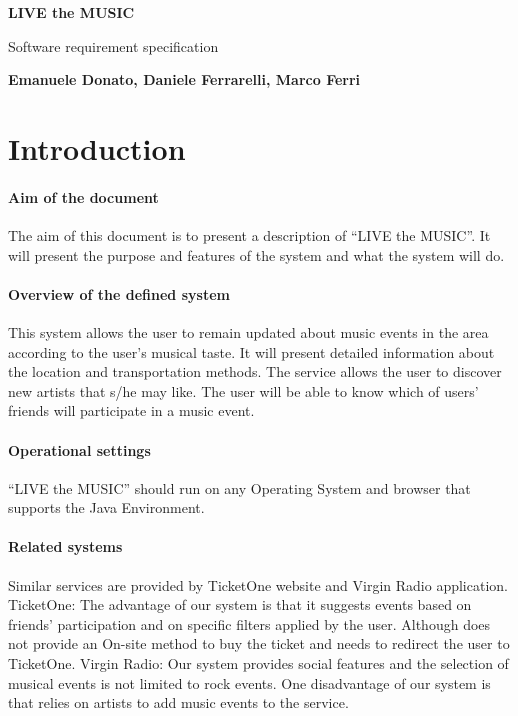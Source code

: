 \documentclass[11pt,a4paper]{article}
\begin{document}
\begin{titlepage}
   \begin{center}
       \vspace*{1cm}
 
       \textbf{LIVE the MUSIC}
 
       \vspace{0.5cm}
        Software requirement specification
 
       \vspace{5cm}
 
       \textbf{Emanuele Donato, Daniele Ferrarelli, Marco Ferri}
 
       \vfill
   \end{center}
\end{titlepage}
\section{Introduction}
\paragraph{Aim of the document}
The aim of this document is to present a description of “LIVE the MUSIC”. It will present the purpose and features of the system and what the system will do.
\paragraph{Overview of the defined system}
This system allows the user to remain updated about music events in the area according to the user’s musical taste. It will present detailed information about the location and transportation methods. The service allows the user to discover new artists that s/he may like. The user will be able to know which of users’ friends will participate in a music event.
\paragraph{Operational settings}
“LIVE the MUSIC” should run on any Operating System and browser that supports the Java Environment. 
\paragraph{Related systems}
Similar services are provided by TicketOne website and Virgin Radio application.
TicketOne: 
The advantage of our system is that it suggests events based on friends’ participation and on specific filters applied by the user. Although does not provide an On-site method to buy the ticket and needs to redirect the user to TicketOne. 
Virgin Radio:
Our system provides social features and the selection of musical events is not limited to rock events. One disadvantage of our system is that relies on artists to add music events to the service.
\end{document}

